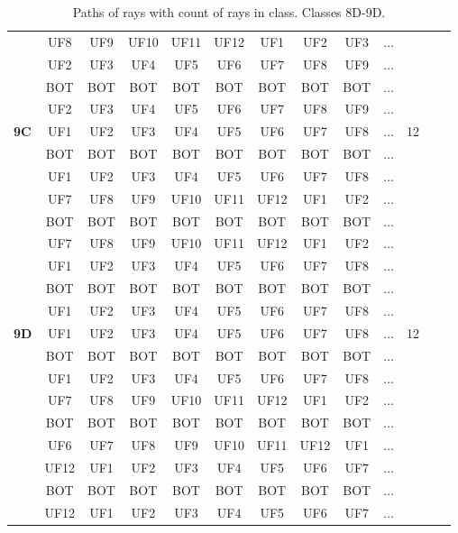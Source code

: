 \begin{table}[h!]
\begin{tabular}{|l|c|c|c|c|c|c|c|c|c|c|c|c|}
 & UF8 & UF9 & UF10 & UF11 & UF12 & UF1 & UF2 & UF3 & $\dots$ & \\
 & UF2 & UF3 & UF4 & UF5 & UF6 & UF7 & UF8 & UF9 & $\dots$ & \\
 & BOT & BOT & BOT & BOT & BOT & BOT & BOT & BOT & $\dots$ & \\
 & UF2 & UF3 & UF4 & UF5 & UF6 & UF7 & UF8 & UF9 & $\dots$ & \\
\hline \hline
\textbf{9C} & UF1 & UF2 & UF3 & UF4 & UF5 & UF6 & UF7 & UF8 & $\dots$ & 12\\
 & BOT & BOT & BOT & BOT & BOT & BOT & BOT & BOT & $\dots$ & \\
 & UF1 & UF2 & UF3 & UF4 & UF5 & UF6 & UF7 & UF8 & $\dots$ & \\
 & UF7 & UF8 & UF9 & UF10 & UF11 & UF12 & UF1 & UF2 & $\dots$ & \\
 & BOT & BOT & BOT & BOT & BOT & BOT & BOT & BOT & $\dots$ & \\
 & UF7 & UF8 & UF9 & UF10 & UF11 & UF12 & UF1 & UF2 & $\dots$ & \\
 & UF1 & UF2 & UF3 & UF4 & UF5 & UF6 & UF7 & UF8 & $\dots$ & \\
 & BOT & BOT & BOT & BOT & BOT & BOT & BOT & BOT & $\dots$ & \\
 & UF1 & UF2 & UF3 & UF4 & UF5 & UF6 & UF7 & UF8 & $\dots$ & \\
\hline \hline
\textbf{9D} & UF1 & UF2 & UF3 & UF4 & UF5 & UF6 & UF7 & UF8 & $\dots$ & 12\\
 & BOT & BOT & BOT & BOT & BOT & BOT & BOT & BOT & $\dots$ & \\
 & UF1 & UF2 & UF3 & UF4 & UF5 & UF6 & UF7 & UF8 & $\dots$ & \\
 & UF7 & UF8 & UF9 & UF10 & UF11 & UF12 & UF1 & UF2 & $\dots$ & \\
 & BOT & BOT & BOT & BOT & BOT & BOT & BOT & BOT & $\dots$ & \\
 & UF6 & UF7 & UF8 & UF9 & UF10 & UF11 & UF12 & UF1 & $\dots$ & \\
 & UF12 & UF1 & UF2 & UF3 & UF4 & UF5 & UF6 & UF7 & $\dots$ & \\
 & BOT & BOT & BOT & BOT & BOT & BOT & BOT & BOT & $\dots$ & \\
 & UF12 & UF1 & UF2 & UF3 & UF4 & UF5 & UF6 & UF7 & $\dots$ & \\
\hline 
\end{tabular}
\caption{Paths of rays with count of rays in class. Classes 8D-9D.}
\label{table:TableClasses4}
\end{table}

